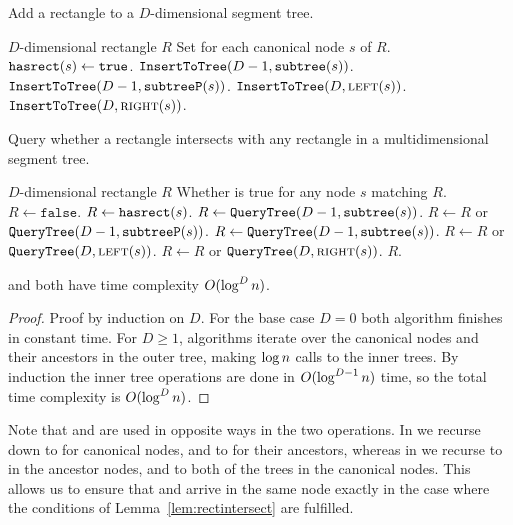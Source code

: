 \documentclass[english,gradu]{tktltiki2018}
\begin{document}
\begin{algorithm}
\caption{Add a rectangle to a $D$-dimensional segment tree.}\label{alg:rectadd}
\begin{algorithmic}
\Require $D$-dimensional rectangle $R$
\Ensure Set  for each canonical node $s$ of $R$.
		\State $\texttt{hasrect}(s)\gets\texttt{true}$.
		\State $\texttt{InsertToTree}(D-1,\texttt{subtree}(s))$.
		\State $\texttt{InsertToTree}(D-1,\texttt{subtreeP}(s))$.
		\State $\texttt{InsertToTree}(D,\textsc{left}(s))$.
		\State $\texttt{InsertToTree}(D,\textsc{right}(s))$.
	\EndIf
\EndProcedure
\end{algorithmic}
\end{algorithm}

\begin{algorithm}
\caption{Query whether a rectangle intersects with any rectangle in a multidimensional segment tree.}\label{alg:rectcheck}
\begin{algorithmic}
\Require $D$-dimensional rectangle $R$
\Ensure Whether  is true for any node $s$ matching $R$.
	\State $R\gets\texttt{false}$.
		\State $R\gets\texttt{hasrect}(s)$.
		\State $R\gets \texttt{QueryTree}(D-1,\texttt{subtree}(s))$.
		\State $R\gets R$ or $\texttt{QueryTree}(D-1,\texttt{subtreeP}(s))$.
		\State $R\gets \texttt{QueryTree}(D-1,\texttt{subtree}(s))$.
		\State $R\gets R$ or $\texttt{QueryTree}(D,\textsc{left}(s))$.
		\State $R\gets R$ or $\texttt{QueryTree}(D,\textsc{right}(s))$.
	\EndIf
	\State \Return $R$.
\EndProcedure
\end{algorithmic}
\end{algorithm}

\begin{lem}\adddt and \checkdt both have time complexity $O(\log^Dn)$.\end{lem}
\begin{proof}
Proof by induction on $D$.
For the base case $D=0$ both algorithm finishes in constant time.
For $D\ge 1$, algorithms iterate over the canonical nodes and their ancestors in the outer tree, making $\log n$ calls to the inner trees.
By induction the inner tree operations are done in $O(\log^{D-1}n)$ time, so the total time complexity is $O(\log^Dn)$.
\end{proof}

Note that \subtree{} and \subtreep{} are used in opposite ways in the two operations.
In \adddt{} we recurse down to \subtree{} for canonical nodes, and to \subtreep{} for their ancestors, whereas in \checkdt{} we recurse to \subtree{} in the ancestor nodes, and to both of the trees in the canonical nodes.
This allows us to ensure that \adddt{} and \checkdt{} arrive in the same node exactly in the case where the conditions of Lemma~\ref{lem:rectintersect} are fulfilled.
\end{document}
